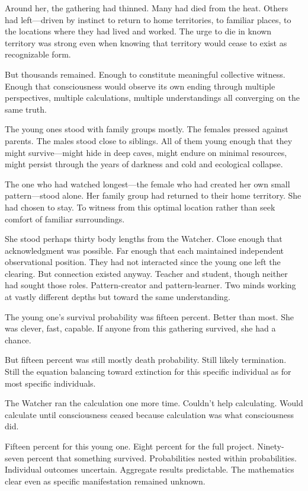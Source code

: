 Around her, the gathering had thinned. Many had died from the heat. Others had left—driven by instinct to return to home territories, to familiar places, to the locations where they had lived and worked. The urge to die in known territory was strong even when knowing that territory would cease to exist as recognizable form.

But thousands remained. Enough to constitute meaningful collective witness. Enough that consciousness would observe its own ending through multiple perspectives, multiple calculations, multiple understandings all converging on the same truth.

The young ones stood with family groups mostly. The females pressed against parents. The males stood close to siblings. All of them young enough that they might survive—might hide in deep caves, might endure on minimal resources, might persist through the years of darkness and cold and ecological collapse.

The one who had watched longest—the female who had created her own small pattern—stood alone. Her family group had returned to their home territory. She had chosen to stay. To witness from this optimal location rather than seek comfort of familiar surroundings.

She stood perhaps thirty body lengths from the Watcher. Close enough that acknowledgment was possible. Far enough that each maintained independent observational position. They had not interacted since the young one left the clearing. But connection existed anyway. Teacher and student, though neither had sought those roles. Pattern-creator and pattern-learner. Two minds working at vastly different depths but toward the same understanding.

The young one's survival probability was fifteen percent. Better than most. She was clever, fast, capable. If anyone from this gathering survived, she had a chance.

But fifteen percent was still mostly death probability. Still likely termination. Still the equation balancing toward extinction for this specific individual as for most specific individuals.

The Watcher ran the calculation one more time. Couldn't help calculating. Would calculate until consciousness ceased because calculation was what consciousness did.

Fifteen percent for this young one. Eight percent for the full project. Ninety-seven percent that something survived. Probabilities nested within probabilities. Individual outcomes uncertain. Aggregate results predictable. The mathematics clear even as specific manifestation remained unknown.

